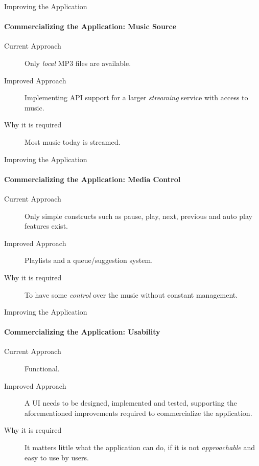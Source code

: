 \begin{frame}{Improving the Application}
    \framesubtitle{Commercializing the Application: Music Source}
    \begin{description}
        \item [Current Approach] Only \textit{local} MP3 files are available.
        \item [Improved Approach] Implementing API support for a larger \textit{streaming} service with access to music.
        \item [Why it is required] Most music today is streamed.
    \end{description}
\end{frame}

\begin{frame}{Improving the Application}
    \framesubtitle{Commercializing the Application: Media Control}
    \begin{description}
        \item [Current Approach] Only simple constructs such as pause, play, next, previous and auto play features exist.
        \item [Improved Approach] Playlists and a queue/suggestion system.
        \item [Why it is required] To have some \textit{control} over the music without constant management.
    \end{description}
\end{frame}

\begin{frame}{Improving the Application}
    \framesubtitle{Commercializing the Application: Usability}
    \begin{description}
        \item [Current Approach] Functional.
        \item [Improved Approach] A UI needs to be designed, implemented and tested, supporting the aforementioned improvements required to commercialize the application.
        \item [Why it is required] It matters little what the application can do, if it is not \textit{approachable} and easy to use by users.
    \end{description}
\end{frame}

